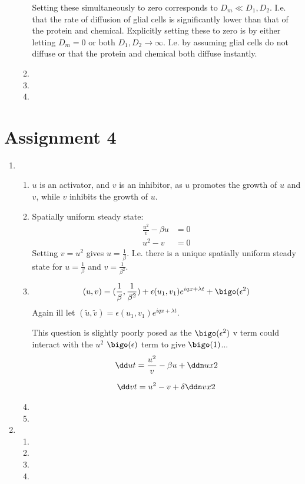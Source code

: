 \documentclass{X:/Documents/Coding/Latex/myassignment}
\begin{document}
\begin{enumerate}
\begin{enumerate}
		Setting these simultaneously to zero corresponds to $D_m \ll D_1,D_2$. I.e. that the rate of diffusion of glial cells is significantly lower than that of the protein and chemical. Explicitly setting these to zero is by either letting $D_m = 0$ or both $D_1,D_2 \to \infty$. I.e. by assuming glial cells do not diffuse or that the protein and chemical both diffuse instantly.
		\item 
		\item 
		\item 
	\end{enumerate}
\end{enumerate}

\clearpage
\section{Assignment 4}

\begin{enumerate}
	\item 
	\begin{enumerate}
		\item $u$ is an activator, and $v$ is an inhibitor, as $u$ promotes the growth of $u$ and $v$, while $v$ inhibits the growth of $u$.
		\item Spatially uniform steady state:
		\begin{align*}
			\frac{u^2}{v} - \beta u &= 0\\
			u^2 - v &= 0
		\end{align*}
		Setting $v = u^2$ gives $u = \frac{1}{\beta}$. I.e. there is a unique spatially uniform steady state for $u = \frac{1}{\beta}$ and $v = \frac{1}{\beta^2}$.
		\item
		\[(u,v) = (\frac{1}{\beta}, \frac{1}{\beta^2}) + \epsilon (u_1,v_1) e^{iqx + \lambda t} + \bigo(\epsilon^2)\] 
		Again ill let $(\tilde{u},\tilde{v}) = \epsilon (u_1,v_1) e^{iqx + \lambda t} $.

		This question is slightly poorly posed as the $\bigo(\epsilon^2)$ v term could interact with the $u^2$ $\bigo(\epsilon)$ term to give $\bigo(1)$...
		\begin{align*}
		\dd ut &= \frac{u^2}{v} - \beta u + \ddn ux2\\
		\end{align*}

		\begin{align*}
		\dd vt &= u^2 - v + \delta \ddn vx2\\
		\end{align*}
		\item 
		\item 
	\end{enumerate}
	\item 
	\begin{enumerate}
		\item 
		\item 
		\item 
		\item 
	\end{enumerate}
\end{enumerate}



% 



\end{document}

